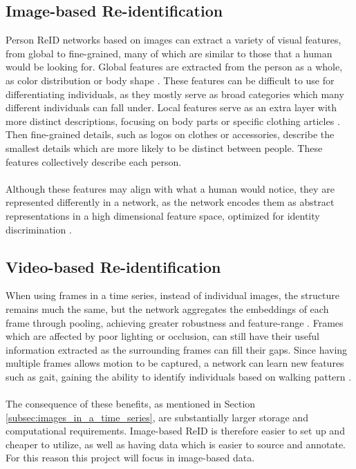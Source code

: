 \subsection{Image-based Re-identification} \label{imagebasedreid}
Person \acs{ReID} networks based on images can extract a variety of visual features, from global to fine-grained, many of which are similar to those that a human would be looking for. Global features are extracted from the person as a whole, as color distribution or body shape \cite{ReIDSurvey2021}. These features can be difficult to use for differentiating individuals, as they mostly serve as broad categories which many different individuals can fall under.  Local features serve as an extra layer with more distinct descriptions, focusing on body parts or specific clothing articles \cite{ReIDSurvey2021}. Then fine-grained details, such as logos on clothes or accessories, describe the smallest details which are more likely to be distinct between people. These features collectively describe each person.
\\\\
Although these features may align with what a human would notice, they are represented differently in a network, as the network encodes them as abstract representations in a high dimensional feature space, optimized for identity discrimination \cite{ReIDSurvey2021}. 

\subsection{Video-based Re-identification}
\label{subsec:VideoReID}
When using frames in a time series, instead of individual images, the structure remains much the same, but the network aggregates the embeddings of each frame through pooling, achieving greater robustness and feature-range \cite{Khaliluzzaman2023Gait}. Frames which are affected by poor lighting or occlusion, can still have their useful information extracted as the surrounding frames can fill their gaps. Since having multiple frames allows motion to be captured, a network can learn new features such as gait, gaining the ability to identify individuals based on walking pattern \cite{Khaliluzzaman2023Gait}. 
\\\\
The consequence of these benefits, as mentioned in Section \ref{subsec:images_in_a_time_series}, are substantially larger storage and computational requirements. Image-based \acs{ReID} is therefore easier to set up and cheaper to utilize, as well as having data which is easier to source and annotate. For this reason this project will focus in image-based data. 

